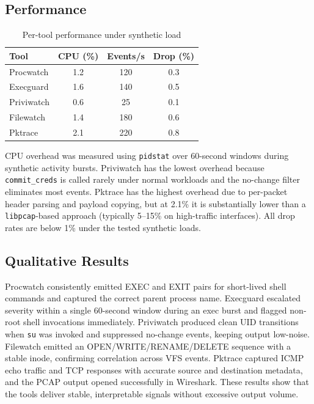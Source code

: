 \documentclass[conference]{IEEEtran}
\begin{document}
\subsection{Performance}

\begin{table}[H]
  \centering
  \caption{Per-tool performance under synthetic load}
  \label{tab:perf}
  \begin{tabular}{|l|c|c|c|}
    \hline
    \textbf{Tool} & \textbf{CPU (\%)} & \textbf{Events/s} & \textbf{Drop (\%)} \\ \hline
    Procwatch  & 1.2 & 120 & 0.3 \\ \hline
    Execguard  & 1.6 & 140 & 0.5 \\ \hline
    Priviwatch & 0.6 &  25 & 0.1 \\ \hline
    Filewatch  & 1.4 & 180 & 0.6 \\ \hline
    Pktrace    & 2.1 & 220 & 0.8 \\ \hline
  \end{tabular}
\end{table}

CPU overhead was measured using \texttt{pidstat} over 60-second windows during synthetic activity bursts. Priviwatch has the lowest overhead because \texttt{commit\_creds} is called rarely under normal workloads and the no-change filter eliminates most events. Pktrace has the highest overhead due to per-packet header parsing and payload copying, but at 2.1\% it is substantially lower than a \texttt{libpcap}-based approach (typically 5--15\% on high-traffic interfaces). All drop rates are below 1\% under the tested synthetic loads.

\subsection{Qualitative Results}
Procwatch consistently emitted EXEC and EXIT pairs for short-lived shell commands and captured the correct parent process name. Execguard escalated severity within a single 60-second window during an exec burst and flagged non-root shell invocations immediately. Priviwatch produced clean UID transitions when \texttt{su} was invoked and suppressed no-change events, keeping output low-noise. Filewatch emitted an OPEN/WRITE/RENAME/DELETE sequence with a stable inode, confirming correlation across VFS events. Pktrace captured ICMP echo traffic and TCP responses with accurate source and destination metadata, and the PCAP output opened successfully in Wireshark. These results show that the tools deliver stable, interpretable signals without excessive output volume.
\end{document}
